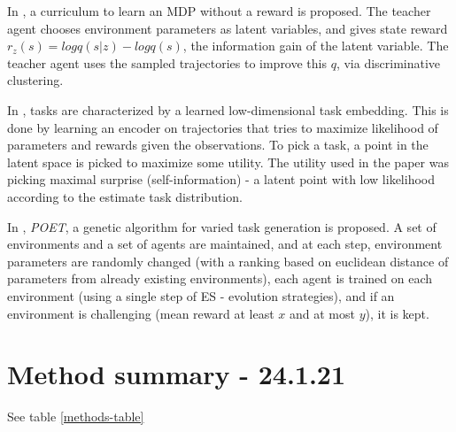 \documentclass[letterpaper]{article}
\theoremstyle{definition}
\begin{document}
In \cite{Jabri2019}, a curriculum to learn an MDP without a reward is proposed. The teacher agent chooses environment parameters as latent variables, and gives state reward $r_z(s) = log q(s|z) - log q(s)$, the information gain of the latent variable. The teacher agent uses the sampled trajectories to improve this $q$, via discriminative clustering.

In \cite{Kaddour2020}, tasks are characterized by a learned low-dimensional task embedding. This is done by learning an encoder on trajectories that tries to maximize likelihood of parameters and rewards given the observations. To pick a task, a point in the latent space is picked to maximize some utility.
The utility used in the paper was picking maximal surprise (self-information) - a latent point with low likelihood according to the estimate task distribution.

In \cite{Wang2019}, \textit{POET}, a genetic algorithm for varied task generation is proposed. A set of environments and a set of agents are maintained, and at each step, environment parameters are randomly changed (with a ranking based on euclidean distance of parameters from already existing environments), each agent is trained on each environment (using a single step of ES - evolution strategies), and if an environment is challenging (mean reward at least $x$ and at most $y$), it is kept.

\section{Method summary - 24.1.21} \label{sec:summary}

See table \ref{methods-table}
\end{document}
